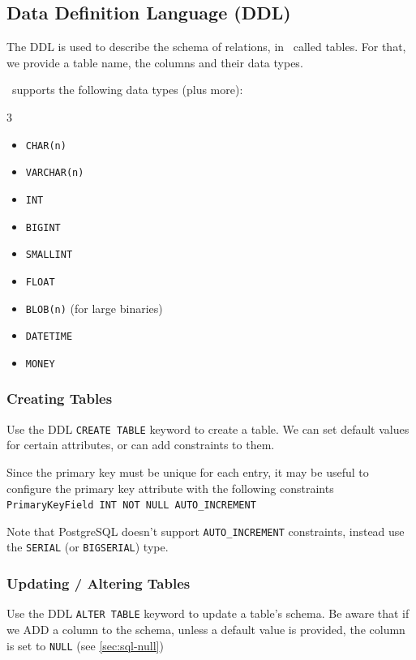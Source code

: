 \subsection{Data Definition Language (DDL)}
The DDL is used to describe the schema of relations, in \sql\ called tables.
For that, we provide a table name, the columns and their data types.

\sql\ supports the following data types (plus more):
\begin{multicols}{3}
    \begin{itemize}[itemsep=-2pt]
        \item \texttt{CHAR(n)}
        \item \texttt{VARCHAR(n)}
        \item \texttt{INT}
        \item \texttt{BIGINT}
        \item \texttt{SMALLINT}
        \item \texttt{FLOAT}
        \item \texttt{BLOB(n)} (for large binaries)
        \item \texttt{DATETIME}
        \item \texttt{MONEY}
    \end{itemize}
\end{multicols}


\subsubsection{Creating Tables}
Use the DDL \texttt{CREATE TABLE} keyword to create a table. We can set default values for certain attributes,
or can add constraints to them.

Since the primary key must be unique for each entry, it may be useful to configure the primary key attribute with the following constraints
\texttt{PrimaryKeyField INT NOT NULL AUTO\_INCREMENT}


Note that PostgreSQL doesn't support \texttt{AUTO\_INCREMENT} constraints, instead use the \texttt{SERIAL} (or \texttt{BIGSERIAL}) type.


\subsubsection{Updating / Altering Tables}
Use the DDL \texttt{ALTER TABLE} keyword to update a table's schema.
Be aware that if we ADD a column to the schema, unless a default value is provided, the column is set to \texttt{NULL} (see \ref{sec:sql-null})

